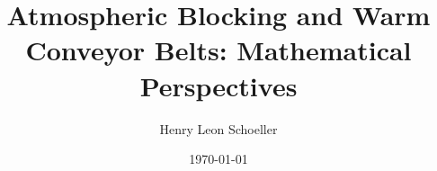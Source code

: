 \usepackage{style/thesis}

\usepackage{appendix}
\usepackage{enumitem}

\usepackage{tikz}
\usepackage{standalone}
\usetikzlibrary{arrows.meta}
\usetikzlibrary{positioning,calc}

\usepackage[hidelinks]{hyperref}
\usepackage[nameinlink]{cleveref}

\usepackage[acronym, nomain]{glossaries}

\makeglossaries



\title{Atmospheric Blocking and Warm Conveyor Belts:
    Mathematical Perspectives}
\author{Henry Leon Schoeller}
\date{\today}

